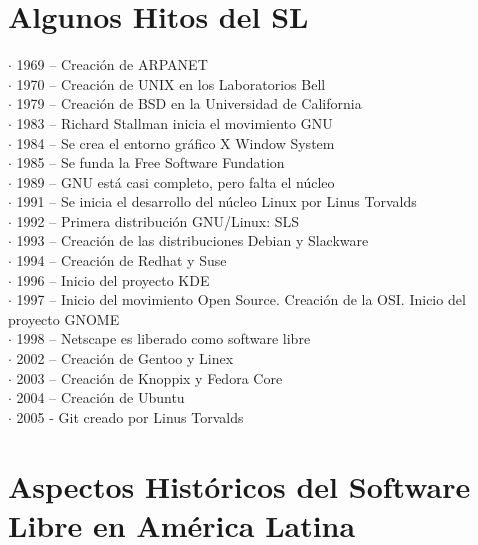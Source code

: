 \section{Algunos Hitos del SL}

\begin{description}
\item[$\cdot$ 1969 – Creación de ARPANET]
\item[$\cdot$ 1970 – Creación de UNIX en los Laboratorios Bell]
\item[$\cdot$ 1979 – Creación de BSD en la Universidad de California]
\item[$\cdot$ 1983 – Richard Stallman inicia el movimiento GNU]
\item[$\cdot$ 1984 – Se crea el entorno gráfico X Window System]
\item[$\cdot$ 1985 – Se funda la Free Software Fundation]
\item[$\cdot$ 1989 – GNU está casi completo, pero falta el núcleo]
\item[$\cdot$ 1991 – Se inicia el desarrollo del núcleo Linux por Linus Torvalds]
\item[$\cdot$ 1992 – Primera distribución GNU/Linux: SLS]
\item[$\cdot$ 1993 – Creación de las distribuciones Debian y Slackware]
\item[$\cdot$ 1994 – Creación de Redhat y Suse]
\item[$\cdot$ 1996 – Inicio del proyecto KDE]
\item[$\cdot$ 1997 – Inicio del movimiento Open Source. Creación de la OSI. Inicio del proyecto GNOME]
\item[$\cdot$ 1998 – Netscape es liberado como software libre]
\item[$\cdot$ 2002 – Creación de Gentoo y Linex]
\item[$\cdot$ 2003 – Creación de Knoppix y Fedora Core]
\item[$\cdot$ 2004 – Creación de Ubuntu]
\item[$\cdot$ 2005 - Git creado por Linus Torvalds]
\end{description}


\section{Aspectos Históricos del Software Libre en América Latina}


